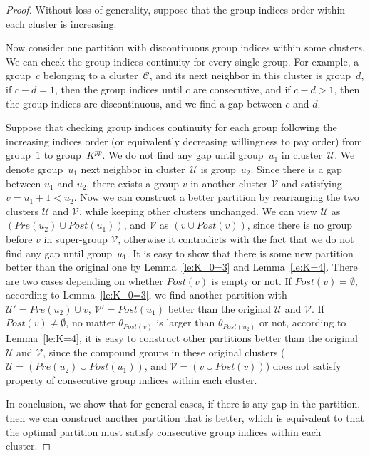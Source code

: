 \documentclass[twocolumn,10pt,twosided]{IEEEtran}
\begin{document}
\begin{proof}
Without loss of generality, suppose that the group indices order
within each cluster is increasing.

Now consider one partition with discontinuous group indices within
some clusters. We can check the group indices continuity for every
single group. For example, a group~$c$ belonging to a cluster~$\mathcal{C}$,
and its next neighbor in this cluster is group~$d$, if $c-d=1$,
then the group indices until $c$ are consecutive, and if $c-d>1$, then
the group indices are discontinuous, and we find a gap between $c$ and
$d$.

Suppose that checking group indices
continuity for each group following the increasing indices
order (or equivalently decreasing willingness to pay order) from group~$1$ to group~$K^{pp}$.
We do not find any gap until group~$u_1$ in cluster~$\mathcal{U}$. We denote group~$u_1$
next neighbor in cluster~$\mathcal{U}$ is group~$u_2$. Since there is a gap between $u_1$ and $u_2$, there exists a group
$v$ in another cluster $\mathcal{V}$ and satisfying $v=u_1+1<u_2$. Now we
can construct a better partition by rearranging the two clusters
$\mathcal{U}$ and $\mathcal{V}$, while keeping other clusters unchanged. We can view
$\mathcal{U}$ as $(Pre(u_2)\cup Post(u_1))$, and $\mathcal{V}$ as $(v\cup Post(v))$,
since there is no group before $v$ in super-group $\mathcal{V}$,  otherwise it
contradicts with the fact that we do not find any gap until group~$u_1$.
It is easy to show that there is some new partition better than
the original one by Lemma~\ref{le:K_0=3} and Lemma~\ref{le:K=4}.
There are two cases depending on whether $Post(v)$ is empty or
not. If $Post(v)=\emptyset$, according to Lemma~\ref{le:K_0=3}, we find another partition with $\mathcal{U}'=Pre(u_2)\cup v$, $\mathcal{V}'=Post(u_1)$
better than the original $\mathcal{U}$ and $\mathcal{V}$. If $Post(v)\ne\emptyset$, no matter
$\theta_{Post(v)}$ is larger than $\theta_{Post(u_2)}$ or not,
according to Lemma~\ref{le:K=4}, it is easy to construct other
partitions better than the original $\mathcal{U}$ and $\mathcal{V}$, since the compound groups in these original clusters
($\mathcal{U}=(Pre(u_2)\cup Post(u_1))$, and $\mathcal{V}=(v\cup Post(v))$) does not satisfy property of consecutive
group indices within each cluster.

In conclusion, we show that for general cases, if there is any gap in
the partition, then we can construct another partition that is
better, which is equivalent to that the optimal partition must satisfy
consecutive group indices within each cluster.
\end{proof}
\end{document}

